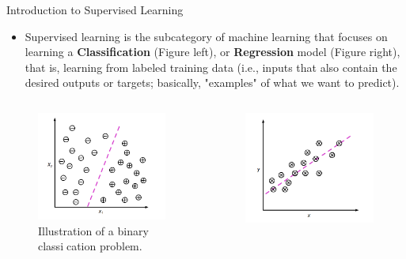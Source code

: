 \documentclass[compress,oilve]{beamer}
\begin{document}
\begin{frame}{Introduction to Supervised Learning}
\begin{itemize}
\item Supervised learning is the subcategory of machine learning that focuses on learning a \textbf{Classification} (Figure left), or \textbf{Regression} model (Figure right), that is, learning from labeled training data (i.e., inputs that also contain the desired outputs or targets; basically, "examples" of what we want to predict).
\end{itemize}
\begin{columns}
\begin{column}{0.4\textwidth}
\begin{figure}
 \centering
 \includegraphics[scale=0.5]{10}  
 \caption{Illustration of a binary classication problem.}
\end{figure}
\end{column}
\begin{column}{0.4\textwidth}
\begin{figure}
 \centering
 \includegraphics[scale=0.5]{11}  

\end{figure}
\end{column}
\end{columns}
\end{frame}
\end{document}
